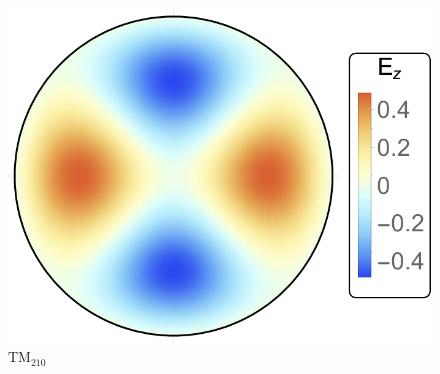 \documentclass[12pt,xcolor=dvipsnames,professionalfonts]{beamer}
\begin{document}
\begin{frame}[t]
\begin{columns}[T]
		\begin{figure}[h]
			\centering
			\hspace*{0.70cm}\includegraphics[scale=0.4]{./figures/tm210.pdf}
			\vspace*{-0.2cm}
			\caption{$\mathrm{TM}_{210}$}
		\end{figure}	
	\end{columns}

\end{frame}
\end{document}
